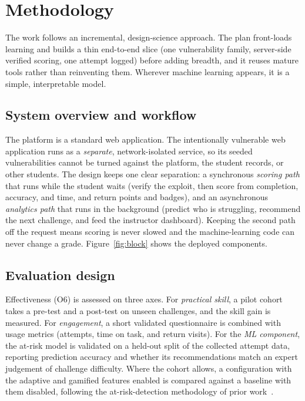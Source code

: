 \section{Methodology}
\label{sec:methodology}

The work follows an incremental, design-science approach. The plan front-loads
learning and builds a thin end-to-end slice (one vulnerability family, server-side
verified scoring, one attempt logged) before adding breadth, and it reuses mature
tools rather than reinventing them. Wherever machine learning appears, it is a
simple, interpretable model.

\subsection{System overview and workflow}

The platform is a standard web application. The intentionally vulnerable web
application runs as a \emph{separate}, network-isolated service, so its seeded
vulnerabilities cannot be turned against the platform, the student records, or other
students. The design keeps one clear separation: a synchronous \emph{scoring path}
that runs while the student waits (verify the exploit, then score from completion,
accuracy, and time, and return points and badges), and an asynchronous
\emph{analytics path} that runs in the background (predict who is struggling,
recommend the next challenge, and feed the instructor dashboard). Keeping the second
path off the request means scoring is never slowed and the machine-learning code can
never change a grade. Figure~\ref{fig:block} shows the deployed components.


\subsection{Evaluation design}

Effectiveness (O6) is assessed on three axes. For \emph{practical skill}, a pilot
cohort takes a pre-test and a post-test on unseen challenges, and the skill gain is
measured. For \emph{engagement}, a short validated questionnaire is combined with
usage metrics (attempts, time on task, and return visits). For the \emph{ML
component}, the at-risk model is validated on a held-out split of the collected
attempt data, reporting prediction accuracy and whether its recommendations match an
expert judgement of challenge difficulty. Where the cohort allows, a configuration
with the adaptive and gamified features enabled is compared against a baseline with
them disabled, following the at-risk-detection methodology of prior
work~\cite{Svabensky2024detecting}.

